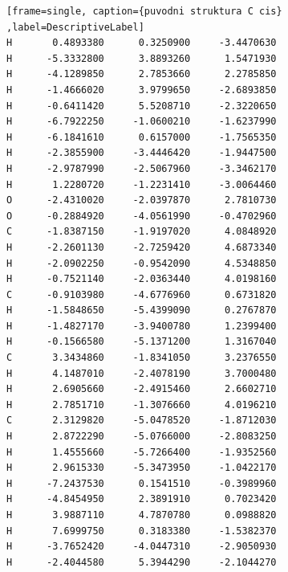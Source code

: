 \documentclass[
digital, %
table,   %
nolof,     %
nolot,     %
oneside,
]{fithesis3}
\begin{document}
\begin{lstlisting}[frame=single, caption={puvodni struktura C cis} ,label=DescriptiveLabel]
H       0.4893380      0.3250900     -3.4470630
H      -5.3332800      3.8893260      1.5471930
H      -4.1289850      2.7853660      2.2785850
H      -1.4666020      3.9799650     -2.6893850
H      -0.6411420      5.5208710     -2.3220650
H      -6.7922250     -1.0600210     -1.6237990
H      -6.1841610      0.6157000     -1.7565350
H      -2.3855900     -3.4446420     -1.9447500
H      -2.9787990     -2.5067960     -3.3462170
H       1.2280720     -1.2231410     -3.0064460
O      -2.4310020     -2.0397870      2.7810730
O      -0.2884920     -4.0561990     -0.4702960
C      -1.8387150     -1.9197020      4.0848920
H      -2.2601130     -2.7259420      4.6873340
H      -2.0902250     -0.9542090      4.5348850
H      -0.7521140     -2.0363440      4.0198160
C      -0.9103980     -4.6776960      0.6731820
H      -1.5848650     -5.4399090      0.2767870
H      -1.4827170     -3.9400780      1.2399400
H      -0.1566580     -5.1371200      1.3167040
C       3.3434860     -1.8341050      3.2376550
H       4.1487010     -2.4078190      3.7000480
H       2.6905660     -2.4915460      2.6602710
H       2.7851710     -1.3076660      4.0196210
C       2.3129820     -5.0478520     -1.8712030
H       2.8722290     -5.0766000     -2.8083250
H       1.4555660     -5.7266400     -1.9352560
H       2.9615330     -5.3473950     -1.0422170
H      -7.2437530      0.1541510     -0.3989960
H      -4.8454950      2.3891910      0.7023420
H       3.9887110      4.7870780      0.0988820
H       7.6999750      0.3183380     -1.5382370
H      -3.7652420     -4.0447310     -2.9050930
H      -2.4044580      5.3944290     -2.1044270

\end{lstlisting}
\newpage
\end{document}
